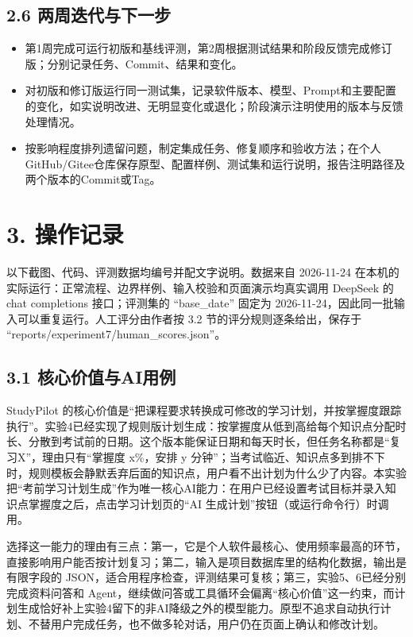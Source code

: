 \documentclass[UTF8,12pt,a4paper]{ctexart}
\begin{document}
\subsection*{2.6 两周迭代与下一步}

\begin{itemize}
  \item 第1周完成可运行初版和基线评测，第2周根据测试结果和阶段反馈完成修订版；分别记录任务、Commit、结果和变化。
  \item 对初版和修订版运行同一测试集，记录软件版本、模型、Prompt和主要配置的变化，如实说明改进、无明显变化或退化；阶段演示注明使用的版本与反馈处理情况。
  \item 按影响程度排列遗留问题，制定集成任务、修复顺序和验收方法；在个人GitHub/Gitee仓库保存原型、配置样例、测试集和运行说明，报告注明路径及两个版本的Commit或Tag。
\end{itemize}

\section*{3. 操作记录}

以下截图、代码、评测数据均编号并配文字说明。数据来自 2026-11-24 在本机的实际运行：正常流程、边界样例、输入校验和页面演示均真实调用 DeepSeek 的 chat completions 接口；评测集的 ``base\_date'' 固定为 2026-11-24，因此同一批输入可以重复运行。人工评分由作者按 3.2 节的评分规则逐条给出，保存于 ``reports/experiment7/human\_scores.json''。

\subsection*{3.1 核心价值与AI用例}

StudyPilot 的核心价值是“把课程要求转换成可修改的学习计划，并按掌握度跟踪执行”。实验4已经实现了规则版计划生成：按掌握度从低到高给每个知识点分配时长、分散到考试前的日期。这个版本能保证日期和每天时长，但任务名称都是“复习X”，理由只有“掌握度 x\%，安排 y 分钟”；当考试临近、知识点多到排不下时，规则模板会静默丢弃后面的知识点，用户看不出计划为什么少了内容。本实验把“考前学习计划生成”作为唯一核心AI能力：在用户已经设置考试目标并录入知识点掌握度之后，点击学习计划页的“AI 生成计划”按钮（或运行命令行）时调用。

选择这一能力的理由有三点：第一，它是个人软件最核心、使用频率最高的环节，直接影响用户能否按计划复习；第二，输入是项目数据库里的结构化数据，输出是有限字段的 JSON，适合用程序检查，评测结果可复核；第三，实验5、6已经分别完成资料问答和 Agent，继续做问答或工具循环会偏离“核心价值”这一约束，而计划生成恰好补上实验4留下的非AI降级之外的模型能力。原型不追求自动执行计划、不替用户完成任务，也不做多轮对话，用户仍在页面上确认和修改计划。
\end{document}
